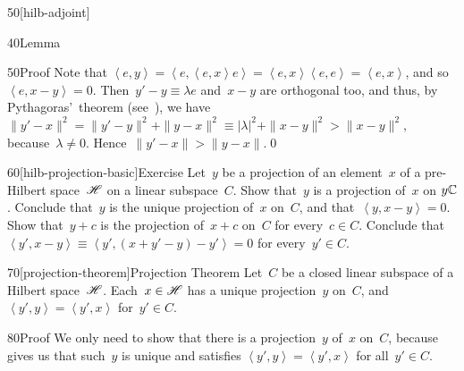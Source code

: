 \begin{parsec}{50}[hilb-adjoint]
\begin{point}{40}{Lemma}
\begin{point}{50}{Proof}
Note that $\left<e,y\right>=\left<e,\left<e,x\right>e\right>=
\left<e,x\right>\left<e,e\right>
= \left<e,x\right>$,
and so~$\left<e,x-y\right>=0$.
Then~$y'-y\equiv \lambda e$ and~$x-y$ are orthogonal too,
and thus, by Pythagoras'~theorem (see~),
we have $\|y'-x\|^2
=\|y'-y\|^2+\|y-x\|^2\equiv \left|\lambda\right|^2+\|x-y\|^2
>\|x-y\|^2$, because~$\lambda\neq 0$.
Hence~$\|y'-x\|>\|y-x\|$.\qed
\end{point}
\end{point}
\begin{point}{60}[hilb-projection-basic]{Exercise}%
Let~$y$ be a projection of an element~$x$ of a pre-Hilbert space~$\mathscr{H}$
on a linear subspace~$C$.
Show that~$y$ is a projection of~$x$ on $y\mathbb{C}$.
Conclude that~$y$ is the unique projection of~$x$ on~$C$,
and that~$\left<y,x-y\right>=0$.
Show that~$y+c$ is the projection of~$x+c$ on~$C$
for every~$c\in C$.
Conclude that~$\left<y',x-y\right>\equiv\left<y',(x+y'-y)-y'\right>=0$ 
for every~$y'\in C$.
\end{point}
\begin{point}{70}[projection-theorem]{Projection Theorem}%
%
Let~$C$ be a closed linear subspace
of a Hilbert space~$\mathscr{H}$.
Each~$x\in \mathscr{H}$
has a unique projection~$y$ on~$C$,
and $\left<y',y\right>=\left<y',x\right>$ for~$y'\in C$.
\begin{point}{80}{Proof}%
We only need to show that there is a projection~$y$
of~$x$ on~$C$,
because~
gives us that such~$y$ is unique and satisfies
$\left<y',y\right> = \left<y',x\right>$ for all~$y'\in C$.


\end{point}
\end{point}
\end{parsec}

